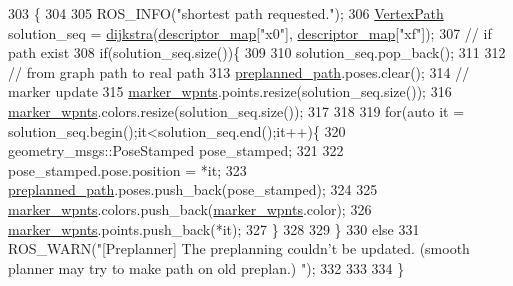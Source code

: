\begin{DoxyCode}
303                                       \{
304 
305     ROS\_INFO(\textcolor{stringliteral}{"shortest path requested."});
306     \hyperlink{_common_8h_a225da2de31d0161f43841ed31cac064c}{VertexPath} solution\_seq = \hyperlink{class_preplanner_adff9209bb0422e7105f8bd3ed577fffd}{dijkstra}(\hyperlink{class_preplanner_a45603cfb24429584c4fc8bc42474e1ff}{descriptor\_map}[\textcolor{stringliteral}{"x0"}],
      \hyperlink{class_preplanner_a45603cfb24429584c4fc8bc42474e1ff}{descriptor\_map}[\textcolor{stringliteral}{"xf"}]);
307     \textcolor{comment}{// if path exist }
308     \textcolor{keywordflow}{if}(solution\_seq.size())\{
309 
310         solution\_seq.pop\_back();
311 
312         \textcolor{comment}{// from graph path to real path }
313         \hyperlink{class_preplanner_ace035c98e9dc23739402d346976d567b}{preplanned\_path}.poses.clear();
314         \textcolor{comment}{// marker update  }
315         \hyperlink{class_preplanner_adcc96f6ec12d7cb9980aa0c889b4ccd1}{marker\_wpnts}.points.resize(solution\_seq.size());
316         \hyperlink{class_preplanner_adcc96f6ec12d7cb9980aa0c889b4ccd1}{marker\_wpnts}.colors.resize(solution\_seq.size());  
317 
318 
319         \textcolor{keywordflow}{for}(\textcolor{keyword}{auto} it = solution\_seq.begin();it<solution\_seq.end();it++)\{
320             geometry\_msgs::PoseStamped pose\_stamped;
321 
322             pose\_stamped.pose.position = *it;
323             \hyperlink{class_preplanner_ace035c98e9dc23739402d346976d567b}{preplanned\_path}.poses.push\_back(pose\_stamped);
324 
325             \hyperlink{class_preplanner_adcc96f6ec12d7cb9980aa0c889b4ccd1}{marker\_wpnts}.colors.push\_back(\hyperlink{class_preplanner_adcc96f6ec12d7cb9980aa0c889b4ccd1}{marker\_wpnts}.color);
326             \hyperlink{class_preplanner_adcc96f6ec12d7cb9980aa0c889b4ccd1}{marker\_wpnts}.points.push\_back(*it);
327         \}
328     
329     \}
330     \textcolor{keywordflow}{else}
331         ROS\_WARN(\textcolor{stringliteral}{"[Preplanner] The preplanning couldn't be updated. (smooth planner may try to make path on
       old preplan.) "});
332     
333     
334 \}
\end{DoxyCode}
